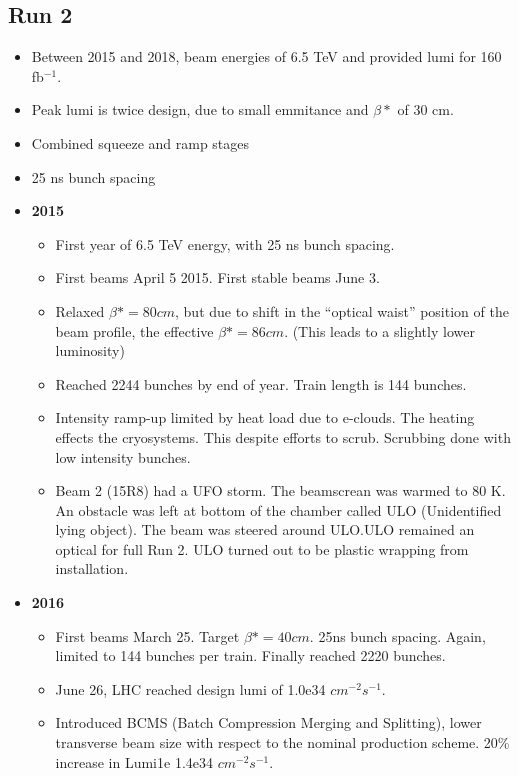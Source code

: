 \subsection{Run 2}
\begin{itemize}
    \item Between 2015 and 2018, beam energies of 6.5 TeV and provided lumi for 160 fb$^{-1}$. \cite{lhcRun2}
    \item Peak lumi is twice design, due to small emmitance and $\beta*$ of 30 cm. \cite{lhcRun2}
    \item Combined squeeze and ramp stages \cite{lhcRun2}
    \item 25 ns bunch spacing \cite{lhcRun2}
    \item \textbf{2015} \cite{lhcRun2}
    \begin{itemize}
        \item First year of 6.5 TeV energy, with 25 ns bunch spacing. \cite{lhcRun2}
        \item First beams April 5 2015. First stable beams June 3. \cite{lhcRun2}
        \item Relaxed $\beta*=80cm$, but due to shift in the ``optical waist'' position of the beam profile, the effective $\beta*=86cm$. (This leads to a slightly lower luminosity) \cite{lhcRun2}
        \item Reached 2244 bunches by end of year. Train length is 144 bunches. \cite{lhcRun2}
        \item Intensity ramp-up limited by heat load due to e-clouds. The heating effects the cryosystems. This despite efforts to scrub. Scrubbing done with low intensity bunches. \cite{lhcRun2}
        \item Beam 2 (15R8) had a UFO storm. The beamscrean was warmed to 80 K. An obstacle was left at bottom of the chamber called ULO (Unidentified lying object). The beam was steered around ULO.ULO remained an optical for full Run 2. ULO turned out to be plastic wrapping from installation. \cite{lhcRun2}
    \end{itemize}
    \item \textbf{2016} \cite{lhcRun2}
    \begin{itemize}
        \item First beams March 25. Target $\beta*=40cm$. 25ns bunch spacing. Again, limited to 144 bunches per train. Finally reached 2220 bunches. \cite{lhcRun2}
        \item June 26, LHC reached design lumi of 1.0e34 $cm^{-2}s^{-1}$. \cite{lhcRun2}
        \item Introduced BCMS (Batch Compression Merging and Splitting), lower transverse beam size with respect to the nominal production scheme. 20\% increase in Lumi1e 1.4e34 $cm^{-2}s^{-1}$.  \cite{lhcRun2}

\end{itemize}
\end{itemize}
